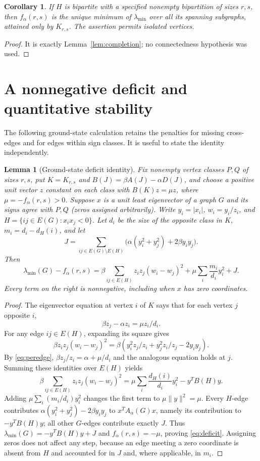 \documentclass[11pt]{amsart}
\newtheorem{lemma}[theorem]{Lemma}
\newtheorem{corollary}[theorem]{Corollary}
\theoremstyle{definition}
\newcommand{\Aa}{A_{\alpha}}
\newcommand{\lam}{\lambda_{\min}}
\begin{document}
\begin{corollary}\label{cor:partition}
If $H$ is bipartite with a specified nonempty bipartition of sizes $r,s$, then $f_\alpha(r,s)$ is the unique minimum of $\lam$ over all its spanning subgraphs, attained only by $K_{r,s}$. The assertion permits isolated vertices.
\end{corollary}
\begin{proof}
It is exactly Lemma~\ref{lem:completion}; no connectedness hypothesis was used.
\end{proof}

\section{A nonnegative deficit and quantitative stability}
The following ground-state calculation retains the penalties for missing cross-edges and for edges within sign classes. It is useful to state the identity independently.

\begin{lemma}[Ground-state deficit identity]\label{lem:identity}
Fix nonempty vertex classes $P,Q$ of sizes $r,s$, put $K=K_{r,s}$ and $B(J)=\beta A(J)-\alpha D(J)$, and choose a positive unit vector $z$ constant on each class with $B(K)z=\mu z$, where $\mu=-f_\alpha(r,s)>0$. Suppose $x$ is a unit least eigenvector of a graph $G$ and its signs agree with $P,Q$ (zeros assigned arbitrarily). Write $y_i=|x_i|$, $w_i=y_i/z_i$, and $H=\{ij\in E(G):x_ix_j<0\}$. Let $d_i$ be the size of the opposite class in $K$, $m_i=d_i-d_H(i)$, and let
\[
 J=\sum_{ij\in E(G)\setminus E(H)}\bigl(\alpha(y_i^2+y_j^2)+2\beta y_iy_j\bigr).
\]
Then
\begin{equation}\label{eq:deficit}
 \lam(G)-f_\alpha(r,s)=
 \beta\sum_{ij\in E(H)}z_iz_j(w_i-w_j)^2
 +\mu\sum_i\frac{m_i}{d_i}y_i^2+J.
\end{equation}
Every term on the right is nonnegative, including when $x$ has zero coordinates.
\end{lemma}
\begin{proof}
The eigenvector equation at vertex $i$ of $K$ says that for each vertex $j$ opposite $i$,
\begin{equation}\label{eq:peredge}
 \beta z_j-\alpha z_i=\mu z_i/d_i.
\end{equation}
For any edge $ij\in E(H)$, expanding its square gives
\[
 \beta z_iz_j(w_i-w_j)^2
 =\beta(y_i^2z_j/z_i+y_j^2z_i/z_j-2y_iy_j).
\]
By \eqref{eq:peredge}, $\beta z_j/z_i=\alpha+\mu/d_i$ and the analogous equation holds at $j$. Summing these identities over $E(H)$ yields
\[
 \beta\sum_{ij\in E(H)}z_iz_j(w_i-w_j)^2
 =\mu\sum_i\frac{d_H(i)}{d_i}y_i^2-y^TB(H)y.
\]
Adding $\mu\sum_i(m_i/d_i)y_i^2$ changes the first term to $\mu\|y\|^2=\mu$. Every $H$-edge contributes $\alpha(y_i^2+y_j^2)-2\beta y_iy_j$ to $x^T\Aa(G)x$, namely its contribution to $-y^TB(H)y$; all other $G$-edges contribute exactly $J$. Thus $\lam(G)=-y^TB(H)y+J$ and $f_\alpha(r,s)=-\mu$, proving \eqref{eq:deficit}. Assigning zeros does not affect any step, because an edge meeting a zero coordinate is absent from $H$ and accounted for in $J$ and, where applicable, in $m_i$.
\end{proof}
\end{document}
